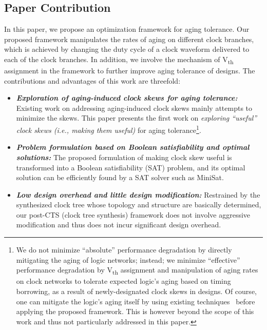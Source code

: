 \subsection{Paper Contribution}
\label{subsec:pc}
In this paper, we propose an optimization framework for aging tolerance. Our proposed framework manipulates the rates of aging on different clock branches, which is achieved by changing the duty cycle of a clock waveform delivered to each of the clock branches. In addition, we involve the mechanism of V\textsubscript{th} assignment in the framework to further improve aging tolerance of designs. The contributions and advantages of this work are threefold:




\begin{itemize}
\item \textbf{\textit{Exploration of aging-induced clock skews for aging tolerance:}} Existing work on addressing aging-induced clock skews mainly attempts to minimize the skews. This paper presents the first work on \textit{exploring \enquote{useful} clock skews (i.e., making them useful)} for aging tolerance\footnote[1]{We do not minimize \enquote{absolute} performance degradation by directly mitigating the aging of logic networks; instead; we minimize \enquote{effective} performance degradation by V\textsubscript{th} assignment and manipulation of aging rates on clock networks to tolerate expected logic's aging based on timing borrowing, as a result of newly-designated clock skews in designs. Of course, one can mitigate the logic's aging itself by using existing techniques~\cite{kumar2007nbti, paul2006temporal, kang2007efficient, yang2007combating} before applying the proposed framework. This is however beyond the scope of this work and thus not particularly addressed in this paper.}.
\item  \textbf{\textit{Problem formulation based on Boolean satisfiability and optimal solutions:}} The proposed formulation of making clock skew useful is transformed into a Boolean satisfiability (SAT) problem, and its optimal solution can be efficiently found by a SAT solver such as MiniSat.
\item \textbf{\textit{Low design overhead and little design modification:}} Restrained by the synthesized clock tree whose topology and structure are basically determined, our post-CTS (clock tree synthesis) framework does not involve aggressive modification and thus does not incur significant design overhead.
\end{itemize}



